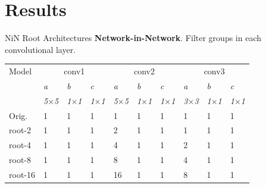 \documentclass[t,xcolor=dvipsnames]{beamer}
\begin{document}
\section*{Results}

\begin{frame}{NiN Root Architectures}
\centering
\textbf{Network-in-Network}. Filter groups in each convolutional layer.
\vfill
\begin{tabular}{@{}lm{1.5em}m{1.5em}m{1.5em}m{1.5em}m{1.5em}m{1.5em}m{1.5em}m{1.5em}m{1.5em}@{}}
\toprule
    Model & \multicolumn{3}{c}{conv1} & \multicolumn{3}{c}{conv2} & \multicolumn{3}{c}{conv3} \\
     & \textit{\footnotesize a} & \textit{\footnotesize b} & \textit{\footnotesize c} & \textit{\footnotesize a} & \textit{\footnotesize b} & \textit{\footnotesize c} & \textit{\footnotesize a} & \textit{\footnotesize b} & \textit{\footnotesize c} \\
     & \textit{\footnotesize5$\times$5} & \textit{\footnotesize1$\times$1} & \textit{\footnotesize1$\times$1} & \textit{\footnotesize5$\times$5} & \textit{\footnotesize1$\times$1} & \textit{\footnotesize1$\times$1} & \textit{\footnotesize3$\times$3} & \textit{\footnotesize1$\times$1} & \textit{\footnotesize1$\times$1} \\
    Orig. & 1 & 1 & 1 & 1 & 1 & 1 & 1 & 1 & 1\\
    \midrule
    root-2 & 1 & 1 & 1 & 2 & 1 & 1 & 1 & 1 & 1\\
    root-4 & 1 & 1 & 1 & 4 & 1 & 1 & 2 & 1 & 1\\
    root-8 & 1 & 1 & 1 & 8 & 1 & 1 & 4 & 1 & 1\\
    root-16 & 1 & 1 & 1 & 16 & 1 & 1 & 8 & 1 & 1\\
    \bottomrule
\end{tabular}
\vfill
\end{frame}
\end{document}
